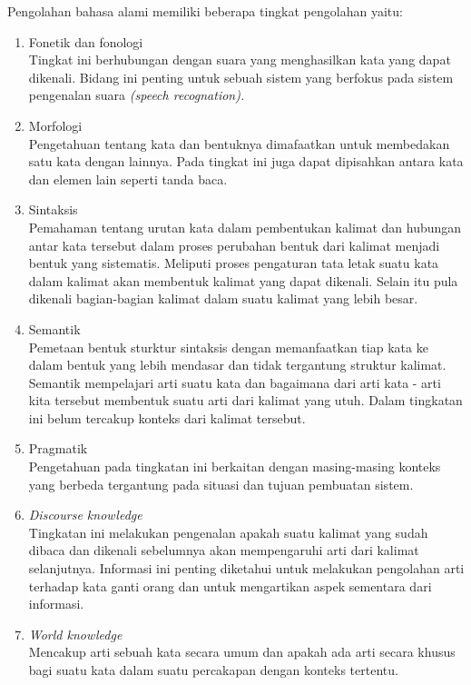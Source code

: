 Pengolahan bahasa alami memiliki beberapa tingkat pengolahan yaitu:
\begin{enumerate}
	\item Fonetik dan fonologi \\
		Tingkat ini berhubungan dengan suara yang menghasilkan kata yang dapat dikenali. Bidang ini penting untuk sebuah sistem yang berfokus pada sistem pengenalan suara \emph{(speech recognation).}
	\item Morfologi \\
		Pengetahuan tentang kata dan bentuknya dimafaatkan untuk membedakan satu kata dengan lainnya. Pada tingkat ini juga dapat dipisahkan antara kata dan elemen lain seperti tanda baca.
	\item Sintaksis \\
		Pemahaman tentang urutan kata dalam pembentukan kalimat dan hubungan antar kata tersebut dalam proses perubahan bentuk dari kalimat menjadi bentuk yang sistematis. Meliputi proses pengaturan tata letak suatu kata dalam kalimat akan membentuk kalimat yang dapat dikenali. Selain itu pula dikenali bagian-bagian kalimat dalam suatu kalimat yang lebih besar.
	\item Semantik\\
		Pemetaan bentuk sturktur sintaksis dengan memanfaatkan tiap kata ke dalam bentuk yang lebih mendasar dan tidak tergantung struktur kalimat. Semantik mempelajari arti suatu kata dan bagaimana dari arti kata - arti kita tersebut membentuk suatu arti dari kalimat yang utuh. Dalam tingkatan ini belum tercakup konteks dari kalimat tersebut.
	\item Pragmatik\\
		Pengetahuan pada tingkatan ini berkaitan dengan masing-masing konteks yang berbeda tergantung pada situasi dan tujuan pembuatan sistem.
	\item \emph{Discourse knowledge}\\
		Tingkatan ini melakukan pengenalan apakah suatu kalimat yang sudah dibaca dan dikenali sebelumnya akan mempengaruhi arti dari kalimat selanjutnya. Informasi ini penting diketahui untuk melakukan pengolahan arti terhadap kata ganti orang dan untuk mengartikan aspek sementara dari informasi.
	\item \emph{World knowledge}\\
		Mencakup arti sebuah kata secara umum dan apakah ada arti secara khusus bagi suatu kata dalam suatu percakapan dengan konteks tertentu.
\end{enumerate}

